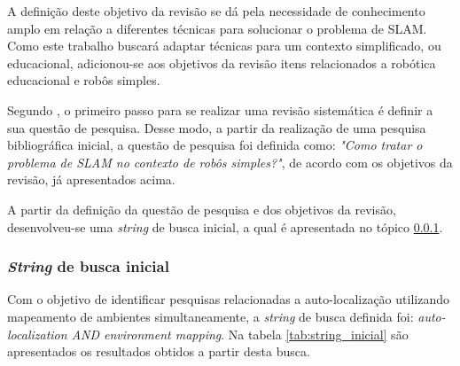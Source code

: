 		A definição deste objetivo da revisão se dá pela necessidade de conhecimento amplo em relação a diferentes técnicas para solucionar o problema de SLAM. Como este trabalho buscará adaptar técnicas para um contexto simplificado, ou educacional, adicionou-se aos objetivos da revisão itens relacionados a robótica educacional e robôs simples.

		Segundo \cite{Kitchenham}, o primeiro passo para se realizar uma revisão sistemática é definir a sua questão de pesquisa. Desse modo, a partir da realização de uma pesquisa bibliográfica inicial, a questão de pesquisa foi definida como: \textit{"Como tratar o problema de SLAM no contexto de robôs simples?"}, de acordo com os objetivos da revisão, já apresentados acima.

		A partir da definição da questão de pesquisa e dos objetivos da revisão, desenvolveu-se uma \textit{string} de busca inicial, a qual é apresentada no tópico \ref{sub:string_inicial}.

		\subsubsection{\textit{String} de busca inicial} %
		\label{sub:string_inicial}
		
			Com o objetivo de identificar pesquisas relacionadas a auto-localização utilizando mapeamento de ambientes simultaneamente, a \textit{string} de busca definida foi: \textit{auto-localization AND environment mapping}. Na tabela \ref{tab:string_inicial} são apresentados os resultados obtidos a partir desta busca.

